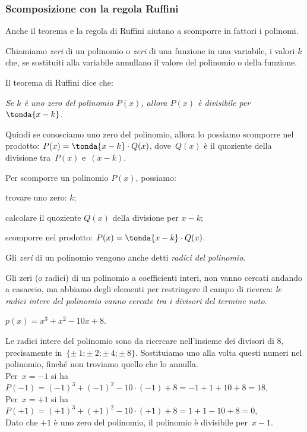 
\subsubsection{Scomposizione con la regola Ruffini}
\label{subsubsec:divpol_scompruff}

Anche il teorema e la regola di Ruffini aiutano a scomporre in fattori i 
polinomi.

Chiamiamo \emph{zeri} di un polinomio o \emph{zeri} di una funzione in 
una variabile, i valori \(k\) che, se sostituiti alla variabile annullano il 
valore del polinomio o della funzione. 

Il teorema di Ruffini dice che:

\begin{center}
\emph{Se \(k\) è uno zero del polinomio \(P(x)\), allora  
\(P(x)\) è divisibile per \(\tonda{x-k}\).}
\end{center}

Quindi se conosciamo uno zero del polinomio, allora lo possiamo 
scomporre nel prodotto: \(P(x) = \tonda{x-k} \cdot Q(x)\), 
dove~\(Q(x)\) è il quoziente della divisione tra~\(P(x)\) e~\((x-k)\).

\begin{procedura}
Per scomporre un polinomio \(P(x)\), possiamo:
\begin{enumeratea}
\item trovare uno zero: \(k\);
\item calcolare il quoziente \(Q(x)\) della divisione per \(x-k\);
\item scomporre nel prodotto: \(P(x) = \tonda{x-k} \cdot Q(x)\).
\end{enumeratea}
\end{procedura}

Gli \emph{zeri} di un polinomio vengono anche detti \emph{radici del polinomio}.

Gli zeri (o radici) di un polinomio a coefficienti interi, non vanno cercati 
andando a casaccio, ma abbiamo degli elementi per restringere il campo di 
ricerca: 
\emph{le radici intere del polinomio vanno cercate tra i divisori del 
termine noto}.

 \begin{esempio}
 \(p(x)=x^3+x^2-10x+8\).
 \end{esempio}
Le radici intere del polinomio sono da ricercare nell'insieme dei divisori di 
\(8\), precisamente in~\(\{\pm~1;\pm~2;\pm~4;\pm~8\}\).
Sostituiamo uno alla volta questi numeri nel polinomio, finché non troviamo 
quello che lo annulla.\\
Per~\(x=-1\) si ha~\(P(-1)=(-1)^{3}+(-1)^{2}-10\cdot (-1)+8=-1+1+10+8=18\),\\
Per~\(x=+1\) si ha~\(P(+1)=(+1)^{3}+(+1)^{2}-10\cdot (+1)+8=1+1-10+8=0\),\\
Dato che \(+1\) è uno zero del polinomio, il polinomio è divisibile 
per~\(x-1\).

